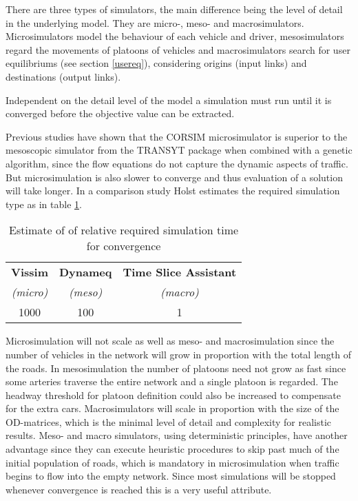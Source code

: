 There are three types of simulators, the main difference being the level of detail in the underlying model. They are micro-, meso- and macrosimulators. Microsimulators model the behaviour of each vehicle and driver, mesosimulators regard the movements of platoons of vehicles and macrosimulators search for user equilibriums (see section \ref{usereq}), considering origins (input links) and destinations (output links).

Independent on the detail level of the model a simulation must run until it is converged before the objective value can be extracted. 

Previous studies have shown that the CORSIM microsimulator is superior to the mesoscopic simulator from the TRANSYT package when combined with a genetic algorithm, since the flow equations do not capture the dynamic aspects of traffic. But microsimulation is also slower to converge and thus evaluation of a solution will take longer. In a comparison study \cite{simcompare} Holst estimates the required simulation type as in table \ref{tab:convergespeed}.

\begin{table}[!ht]
\begin{center}
\begin{tabular}{c|c|c}
\textbf{Vissim} & \textbf{Dynameq} & \textbf{Time Slice Assistant} \\
\textit{(micro)} & \textit{(meso)} & \textit{(macro)} \\ \hline
1000 & 100 & 1
\end{tabular}
\end{center}
\caption{Estimate of of relative required simulation time for convergence}
\label{tab:convergespeed}
\end{table}

Microsimulation will not scale as well as meso- and macrosimulation since the number of vehicles in the network will grow in proportion with the total length of the roads. In mesosimulation the number of platoons need not grow as fast since some arteries traverse the entire network and a single platoon is regarded. The headway threshold for platoon definition could also be increased to compensate for the extra cars. Macrosimulators will scale in proportion with the size of the OD-matrices, which is the minimal level of detail and complexity for realistic results. 
Meso- and macro simulators, using deterministic principles, have another advantage since they can execute heuristic procedures to skip past much of the initial population of roads, which is mandatory in microsimulation when traffic begins to flow into the empty network. Since most simulations will be stopped whenever convergence is reached this is a very useful attribute.

